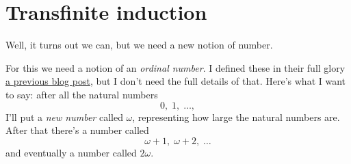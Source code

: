 \section{Transfinite induction}
Well, it turns out we can, but we need a new notion of number.

For this we need a notion of an \emph{ordinal number}.
I defined these in their full glory
\href{https://usamo.wordpress.com/2014/11/18/set-theory-part-2-constructing-the-ordinals/}%
{a previous blog post}, but I don't need the full details of that.
Here's what I want to say:
after all the natural numbers 
\[ 0, \; 1, \; \dots, \]
I'll put a \emph{new number} called $\omega$, representing how large the natural numbers are.
After that there's a number called 
\[\omega+1, \; \omega+2, \; \dots \]
and eventually a number called $2\omega$.

